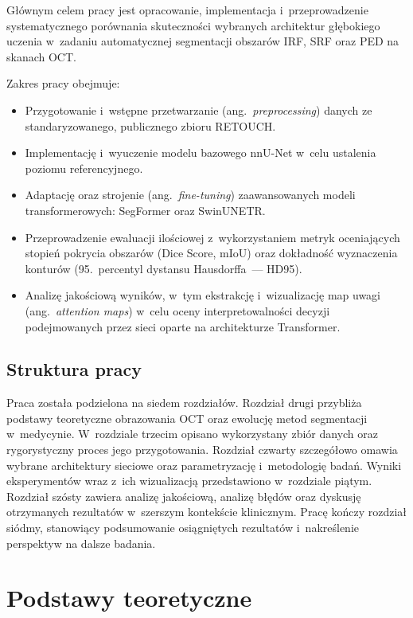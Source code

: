 \documentclass[12pt,a4paper,oneside]{report}
\begin{document}
Głównym celem pracy jest opracowanie, implementacja i~przeprowadzenie systematycznego porównania skuteczności wybranych architektur głębokiego uczenia w~zadaniu automatycznej segmentacji obszarów IRF, SRF oraz PED na skanach OCT.\@ 

Zakres pracy obejmuje:
\begin{itemize}
 \item Przygotowanie i~wstępne przetwarzanie (ang.~\textit{preprocessing}) danych ze standaryzowanego, publicznego zbioru RETOUCH.\@
 \item Implementację i~wyuczenie modelu bazowego nnU-Net w~celu ustalenia poziomu referencyjnego.
 \item Adaptację oraz strojenie (ang.~\textit{fine-tuning}) zaawansowanych modeli transformerowych: SegFormer oraz SwinUNETR.\@
 \item Przeprowadzenie ewaluacji ilościowej z~wykorzystaniem metryk oceniających stopień pokrycia obszarów (Dice Score, mIoU) oraz dokładność wyznaczenia konturów (95.\ percentyl dystansu Hausdorffa~--- HD95).
 \item Analizę jakościową wyników, w~tym ekstrakcję i~wizualizację map uwagi (ang.~\textit{attention maps}) w~celu oceny interpretowalności decyzji podejmowanych przez sieci oparte na architekturze Transformer.
\end{itemize}

\section{Struktura pracy}

Praca została podzielona na siedem rozdziałów. Rozdział drugi przybliża podstawy teoretyczne obrazowania OCT oraz ewolucję metod segmentacji w~medycynie. W~rozdziale trzecim opisano wykorzystany zbiór danych oraz rygorystyczny proces jego przygotowania. Rozdział czwarty szczegółowo omawia wybrane architektury sieciowe oraz parametryzację i~metodologię badań. Wyniki eksperymentów wraz z~ich wizualizacją przedstawiono w~rozdziale piątym. Rozdział szósty zawiera analizę jakościową, analizę błędów oraz dyskusję otrzymanych rezultatów w~szerszym kontekście klinicznym. Pracę kończy rozdział siódmy, stanowiący podsumowanie osiągniętych rezultatów i~nakreślenie perspektyw na dalsze badania.

\chapter{Podstawy teoretyczne}
\end{document}
